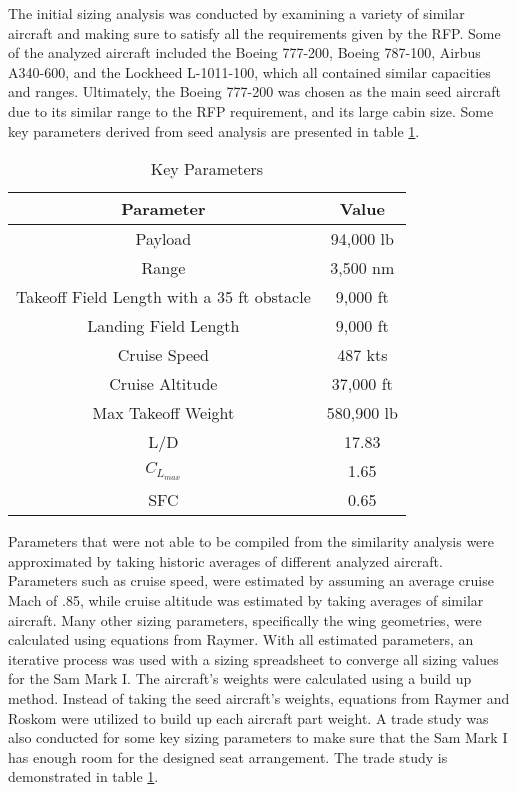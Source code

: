 The initial sizing analysis was conducted by examining a variety of similar aircraft and making sure to satisfy all the requirements given by the RFP. Some of the analyzed aircraft included the Boeing 777-200, Boeing 787-100, Airbus A340-600, and the Lockheed L-1011-100, which all contained similar capacities and ranges. Ultimately, the Boeing 777-200 was chosen as the main seed aircraft due to its similar range to the RFP requirement, and its large cabin size. Some key parameters derived from seed analysis are presented in table \ref{tab:req}. 

\begin{table}[h!] 
    \centering
    \caption{Key Parameters}
    \begin{tabular}{ |c||c| }\toprule
    \textbf{Parameter} & \textbf{Value} \\\hline\hline
    Payload & 94,000 lb  \\\hline
    Range & 3,500 nm \\\hline
    Takeoff Field Length with a 35 ft obstacle & 9,000 ft  \\\hline
    Landing Field Length & 9,000 ft \\\hline
    Cruise Speed & 487 kts\\\hline
    Cruise Altitude & 37,000 ft \\\hline
    Max Takeoff Weight & 580,900 lb\\\hline 
    L/D & 17.83\\\hline 
    $C_{L_{max}}$ & 1.65\\\hline 
    SFC & 0.65\\\hline 

    \end{tabular}\label{tab:req}
\end{table}

Parameters that were not able to be compiled from the similarity analysis were approximated by taking historic averages of different analyzed aircraft. Parameters such as cruise speed, were estimated by assuming an average cruise Mach of .85, while cruise altitude was estimated by taking averages of similar aircraft. Many other sizing parameters, specifically the wing geometries, were calculated using equations from Raymer. With all estimated parameters, an iterative process was used with a sizing spreadsheet to converge all sizing values for the Sam Mark I. The aircraft's weights were calculated using a build up method. Instead of taking the seed aircraft's weights, equations from Raymer and Roskom were utilized to build up each aircraft part weight. A trade study was also conducted for some key sizing parameters to make sure that the Sam Mark I has enough room for the designed seat arrangement. The trade study is demonstrated in table \ref{tab:req}.

